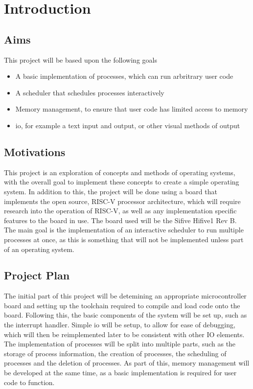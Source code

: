 \chapter{Introduction}
\label{cha:intro}
\section{Aims}
This project will be based upon the following goals
\begin{itemize}
    \item A basic implementation of processes, which can run arbritrary user code
    \item A scheduler that schedules processes interactively
    \item Memory management, to ensure that user code has limited access to memory
    \item \ac{io}, for example a text input and output, or other visual methods of output
\end{itemize}
\section{Motivations}
This project is an exploration of concepts and methods of operating systems, with the overall goal to implement these concepts to create a simple operating system. 
In addition to this, the project will be done using a board that implements the open source, RISC-V processor architecture, which will require research into the operation of RISC-V, as well as any implementation specific features to the board in use. The board used will be the Sifive Hifive1 Rev B.
The main goal is the implementation of an interactive scheduler to run multiple processes at once, as this is something that will not be implemented unless part of an operating system.

\section{Project Plan}
The initial part of this project will be detemining an appropriate microcontroller board and setting up the toolchain required to compile and load code onto the board. Following this, the basic components of the system will be set up, such as the interrupt handler. Simple \ac{io} will be setup, to allow for ease of debugging, which will then be reimplemented later to be consistent with other IO elements. The implementation of processes will be split into multiple parts, such as the storage of process information, the creation of processes, the scheduling of processes and the deletion of processes. As part of this, memory management will be developed at the same time, as a basic implementation is required for user code to function.


